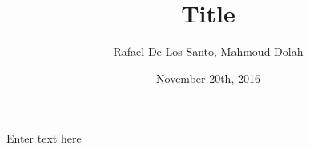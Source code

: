 \documentclass{article}
\title{Title}
\author{Rafael De Los Santo, Mahmoud Dolah}
\date{November 20th, 2016}
\begin{document}
\maketitle
Enter text here



\end{document}
